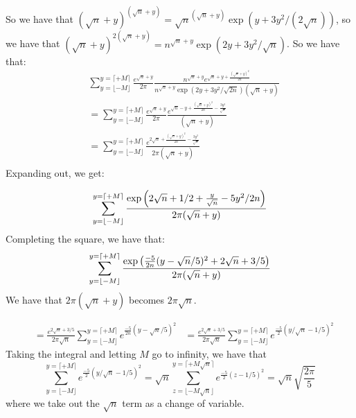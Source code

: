 \documentclass[]{article}
\begin{document}
So we have that $\left(\sqrt{n} + y\right)^{(\sqrt{n} + y)} = \sqrt{n}^{(\sqrt{n} + y)} \exp(y + 3y^2/(2 \sqrt{n}))$, so we have that $\left(\sqrt{n} + y\right)^{2(\sqrt{n} + y)} = n^{\sqrt{n} + y} \exp(2y + 3y^2/\sqrt{n})$. 
 So we have that:
\begin{align*}
	&\sum_{y = \lfloor -M \rfloor }^{y =  \lceil + M \rceil}
	\frac{e^{\sqrt{n} + y}}{2\pi}
	\frac{n^{\sqrt{n} + y} e^{\sqrt{n} + y + \frac{(\sqrt{n} + y)^2}{2n}}}
	{ n^{\sqrt{n} + y}\exp(2y + 3y^2/\sqrt{2n}) (\sqrt{n} + y) }\\
	&=
	\sum_{y = \lfloor -M \rfloor }^{y =  \lceil + M \rceil}
	\frac{e^{\sqrt{n} + y}}{2\pi}
	\frac{ e^{\sqrt{n} - y + \frac{(\sqrt{n} + y)^2}{2n} - \frac{3y^2}{\sqrt{n}}}}
	{(\sqrt{n} + y) }\\
	&=
	\sum_{y = \lfloor -M \rfloor }^{y =  \lceil + M \rceil}
	\frac{ e^{2\sqrt{n} + \frac{(\sqrt{n} + y)^2}{2n} - \frac{3y^2}{\sqrt{n}}}}
	{2 \pi(\sqrt{n} + y) }\\
\end{align*}
Expanding out, we get:

\begin{equation}
	\sum_{y = \lfloor -M \rfloor }^{y =  \lceil + M \rceil}
	\frac{\exp\left(2 \sqrt{n} + 1/2 + \frac{y}{\sqrt{n}} - 5y^2/2n\right)}
	{2 \pi(\sqrt{n} + y) }\\
\end{equation}
Completing the square, we have that:
\begin{equation}
	\sum_{y = \lfloor -M \rfloor }^{y =  \lceil + M \rceil}
	\frac{\exp\left(\frac{-5}{2n}( y - \sqrt{n}/5)^2 + 2 \sqrt{n} + 3/5  \right)}
	{2 \pi(\sqrt{n} + y) }\\
\end{equation}
We have that $2 \pi (\sqrt{n} + y)$ becomes $2 \pi \sqrt{n}$.

\begin{align*}
	&=
	\frac{e^{2 \sqrt{n} + 3/5}}{2 \pi \sqrt{n}}
	\sum_{y = \lfloor -M \rfloor }^{y =  \lceil + M \rceil}
	e^{\frac{-5}{2n}( y - \sqrt{n}/5)^2}
	&=
	\frac{e^{2 \sqrt{n} + 3/5}}{2 \pi \sqrt{n}}
	\sum_{y = \lfloor -M \rfloor }^{y =  \lceil + M \rceil}
	e^{\frac{-5}{2}( y/\sqrt{n} - 1/5)^2}
\end{align*}
Taking the integral and letting $M$ go to infinity, we have that
\begin{equation}
		\sum_{y = \lfloor -M \rfloor }^{y =  \lceil + M \rceil}
	e^{\frac{-5}{2}( y/\sqrt{n} - 1/5)^2} =
		\sqrt{n} \sum_{z = \lfloor -M \sqrt{n} \rfloor }^{y =  \lceil + M \sqrt{n} \rceil}
	e^{\frac{-5}{2}( z - 1/5)^2} = \sqrt{n} \sqrt{\frac{2 \pi}{5}}
\end{equation}
where we take out the $\sqrt{n}$ term as a change of variable. 
\end{document}
